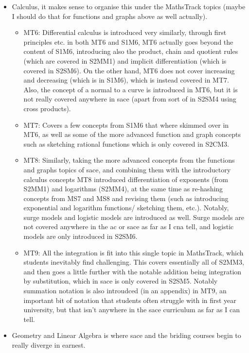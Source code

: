 \documentclass[twoside,12pt,a4paper]{report}
\begin{document}
\begin{itemize}
	\item Calculus, it makes sense to organise this under the MathsTrack topics (maybe I should do that for functions and graphs above as well actually).
		\begin{itemize}
			\item MT6: Differential calculus is introduced very similarly, through first principles etc. in both MT6 and S1M6, MT6 actually goes beyond the content of S1M6, introducing also the product, chain and quotient rules (which are covered in S2MM1) and implicit differentiation (which is covered in S2SM6). On the other hand, MT6 does not cover increasing and decreasing (which is in S1M6), which is instead covered in MT7. Also, the concept of a normal to a curve is introduced in MT6, but it is not really covered anywhere in \gls{sace} (apart from sort of in S2SM4 using cross products).
			\item MT7: Covers a few concepts from S1M6 that where skimmed over in MT6, as well as some of the more advanced function and graph concepts such as sketching rational functions which is only covered in S2CM3.
			\item MT8: Similarly, taking the more advanced concepts from the functions and graphs topics of \gls{sace}, and combining them with the introductory calculus concepts MT8 introduced differentiation of exponents  (from S2MM1) and logarithms (S2MM4), at the same time as re-hashing concepts from MS7 and MS8 and revising them (such as introducing exponential and logarithm functions/ sketching them, etc.).  Notably, surge models and logistic models are introduced as well. Surge models are not covered anywhere in the \gls{ac} or \gls{sace} as far as I cna tell, and logistic models are only introduced in S2SM6.
			\item MT9: All the integration is fit into this single topic in MathsTrack, which students inevitably find challenging. This covers essentially all of S2MM3, and then goes a little further with the notable addition being integration by substitution, which in \gls{sace} is only covered in S2SM5. Notably summation notation is also introudced (in an appendix) in MT9, an important bit of notation that students often struggle with in first year university, but that isn't anywhere in the \gls{sace} curriculum as far as I can tell.
		\end{itemize}
	\item Geometry and Linear Algebra is where \gls{sace} and the briding courses begin to really diverge in earnest.
		\begin{itemize}

\end{itemize}
\end{itemize}
\end{document}

